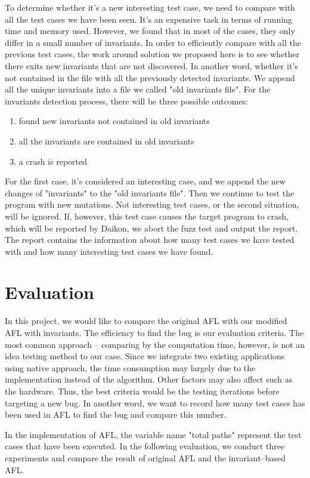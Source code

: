 \documentclass[sigplan,10pt,review = false]{acmart}\settopmatter{printfolios=true,printccs=false,printacmref=false}
\begin{document}
To determine whether it's a new interesting test case, we need to compare with all the test cases we have been seen. It's an expensive task in terms of running time and memory used. However, we found that in most of the cases, they only differ in a small number of invariants. In order to efficiently compare with all the previous test cases, the work around solution we proposed here is to see whether there exits new invariants that are not discovered. In another word, whether it's not contained in the file with all the previously detected invariants. We append all the unique invariants into a file we called "old invariants file". For the invariants detection process, there will be three possible outcomes:
\begin{enumerate}
\item found new invariants not contained in old invariants
\item all the invariants are contained in old invariants
\item a crash is reported
\end{enumerate}
For the first case, it's considered an interesting case, and we  append the new changes of "invariants" to the "old invariants file". Then we continue to test the program with new mutations. Not interesting test cases, or the second situation, will be ignored. If, however, this test case causes the target program to crash, which will be reported by Daikon, we abort the fuzz test and output the report. The report contains the information about how many test cases we have tested with and how many interesting test cases we have found.  

\section{Evaluation}
In this project, we would like to compare the original AFL with our modified AFL with invariants. The efficiency to find the bug is our evaluation criteria. The most common approach -- comparing by the computation time, however, is not an idea testing method to our case. Since we integrate two existing applications using native approach, the time consumption may largely due to the implementation instead of the algorithm. Other factors may also affect such as the hardware. Thus, the best criteria would be the testing iterations before targeting a new bug. In another word, we want to record how many test cases has been used in AFL to find the bug and compare this number.

In the implementation of AFL, the variable name "total paths" represent the test cases that have been executed. In the following evaluation, we conduct three experiments and compare the result of original AFL and the invariant--based AFL.
\end{document}

